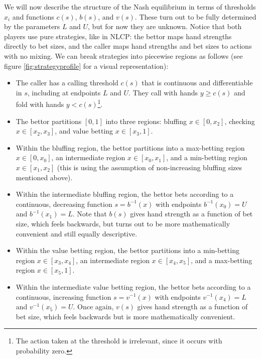 \documentclass[../../main/main.tex]{subfiles}
\begin{document}
We will now describe the structure of the Nash equilibrium in terms of thresholds $x_i$ and functions $c(s)$, $b(s)$, and $v(s)$. These turn out to be fully determined by the parameters $L$ and $U$, but for now they are unknown. Notice that both players use pure strategies, like in NLCP: the bettor maps hand strengths directly to bet sizes, and the caller maps hand strengths and bet sizes to actions with no mixing. We can break strategies into piecewise regions as follows (see figure \ref{fig:strategyprofile} for a visual representation):

    \begin{itemize}
        \item The caller has a calling threshold $c(s)$ that is continuous and differentiable in $s$, including at endpoints $L$ and $U$. They call with hands $y \geq c(s)$ and fold with hands $y < c(s)$\footnote{The action taken at the threshold is irrelevant, since it occurs with probability zero.}.
        \item The bettor partitions $[0,1]$ into three regions: bluffing $x \in [0,x_2]$, checking $x \in [x_2,x_3]$, and value betting $x \in [x_3,1]$.
        \item Within the bluffing region, the bettor partitions into a max-betting region $x \in [0,x_0]$, an intermediate region $x \in [x_0,x_1]$, and a min-betting region $x \in [x_1,x_2]$ (this is using the assumption of non-increasing bluffing sizes mentioned above).
        \item Within the intermediate bluffing region, the bettor bets according to a continuous, decreasing function $s=b^{-1}(x)$ with endpoints $b^{-1}(x_0)=U$ and $b^{-1}(x_1)=L$. Note that $b(s)$ gives hand strength as a function of bet size, which feels backwards, but turns out to be more mathematically convenient and still equally descriptive.
        \item Within the value betting region, the bettor partitions into a min-betting region $x \in [x_3,x_4]$, an intermediate region $x \in [x_4,x_5]$, and a max-betting region $x \in [x_5,1]$.
        \item Within the intermediate value betting region, the bettor bets according to a continuous, increasing function $s=v^{-1}(x)$ with endpoints $v^{-1}(x_4)=L$ and $v^{-1}(x_5)=U$. Once again, $v(s)$ gives hand strength as a function of bet size, which feels backwards but is more mathematically convenient.
    \end{itemize}
\end{document}
